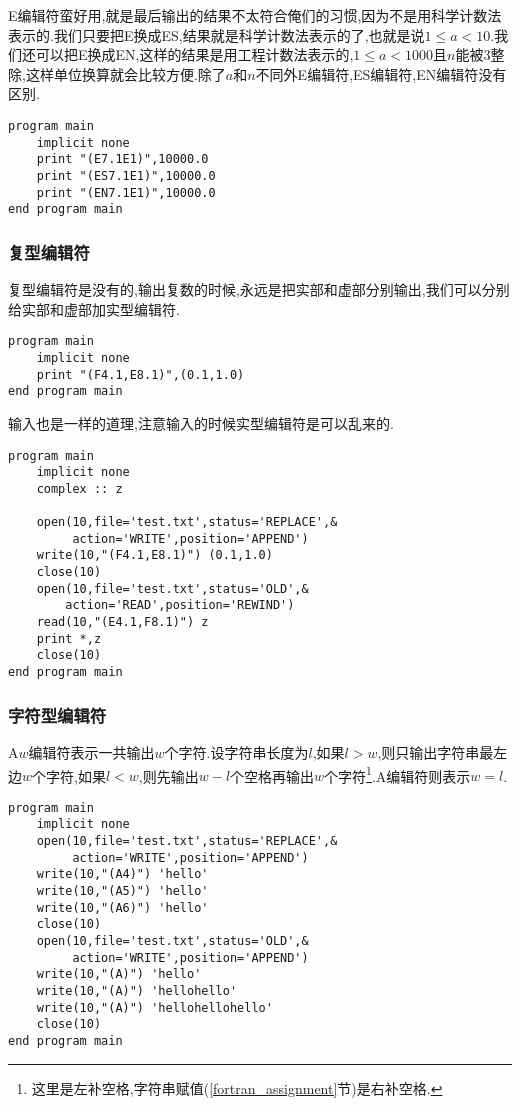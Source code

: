 E编辑符蛮好用,就是最后输出的结果不太符合俺们的习惯,因为不是用科学计数法表示的.我们只要把E换成ES,结果就是科学计数法表示的了,也就是说$1\leqslant a<10$.我们还可以把E换成EN,这样的结果是用工程计数法表示的,$1\leqslant a<1000$且$n$能被$3$整除,这样单位换算就会比较方便.除了$a$和$n$不同外E编辑符,ES编辑符,EN编辑符没有区别.
\begin{lstlisting}
program main
    implicit none
    print "(E7.1E1)",10000.0
    print "(ES7.1E1)",10000.0
    print "(EN7.1E1)",10000.0
end program main
\end{lstlisting}

\subsubsection{复型编辑符}

复型编辑符是没有的,输出复数的时候,永远是把实部和虚部分别输出,我们可以分别给实部和虚部加实型编辑符.
\begin{lstlisting}
program main
    implicit none
    print "(F4.1,E8.1)",(0.1,1.0)
end program main
\end{lstlisting}
输入也是一样的道理,注意输入的时候实型编辑符是可以乱来的.
\begin{lstlisting}
program main
    implicit none
    complex :: z

    open(10,file='test.txt',status='REPLACE',&
         action='WRITE',position='APPEND')
    write(10,"(F4.1,E8.1)") (0.1,1.0)
    close(10)
    open(10,file='test.txt',status='OLD',&
        action='READ',position='REWIND')
    read(10,"(E4.1,F8.1)") z
    print *,z
    close(10)
end program main
\end{lstlisting}

\subsubsection{字符型编辑符}

A$w$编辑符表示一共输出$w$个字符.设字符串长度为$l$,如果$l>w$,则只输出字符串最左边$w$个字符,如果$l<w$,则先输出$w-l$个空格再输出$w$个字符\footnote{这里是左补空格,字符串赋值(\ref{fortran_assignment}节)是右补空格.}.A编辑符则表示$w=l$.
\begin{lstlisting}
program main
    implicit none
    open(10,file='test.txt',status='REPLACE',&
         action='WRITE',position='APPEND')
    write(10,"(A4)") 'hello'
    write(10,"(A5)") 'hello'
    write(10,"(A6)") 'hello'
    close(10)
    open(10,file='test.txt',status='OLD',&
         action='WRITE',position='APPEND')
    write(10,"(A)") 'hello'
    write(10,"(A)") 'hellohello'
    write(10,"(A)") 'hellohellohello'
    close(10)
end program main
\end{lstlisting}

